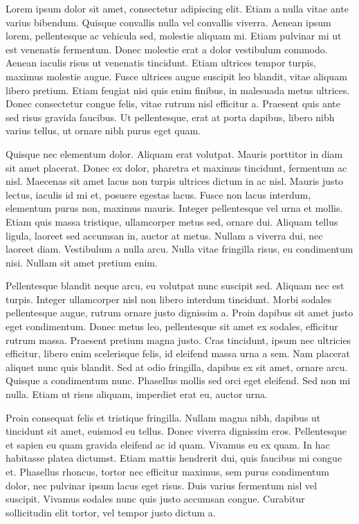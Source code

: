 \documentclass{novanarrative}
\begin{document}
Lorem ipsum dolor sit amet, consectetur adipiscing elit. Etiam a nulla vitae ante varius bibendum. Quisque convallis nulla vel convallis viverra. Aenean ipsum lorem, pellentesque ac vehicula sed, molestie aliquam mi. Etiam pulvinar mi ut est venenatis fermentum. Donec molestie erat a dolor vestibulum commodo. Aenean iaculis risus ut venenatis tincidunt. Etiam ultrices tempor turpis, maximus molestie augue. Fusce ultrices augue suscipit leo blandit, vitae aliquam libero pretium. Etiam feugiat nisi quis enim finibus, in malesuada metus ultrices. Donec consectetur congue felis, vitae rutrum nisl efficitur a. Praesent quis ante sed risus gravida faucibus. Ut pellentesque, erat at porta dapibus, libero nibh varius tellus, ut ornare nibh purus eget quam.

Quisque nec elementum dolor. Aliquam erat volutpat. Mauris porttitor in diam sit amet placerat. Donec ex dolor, pharetra et maximus tincidunt, fermentum ac nisl. Maecenas sit amet lacus non turpis ultrices dictum in ac nisl. Mauris justo lectus, iaculis id mi et, posuere egestas lacus. Fusce non lacus interdum, elementum purus non, maximus mauris. Integer pellentesque vel urna et mollis. Etiam quis massa tristique, ullamcorper metus sed, ornare dui. Aliquam tellus ligula, laoreet sed accumsan in, auctor at metus. Nullam a viverra dui, nec laoreet diam. Vestibulum a nulla arcu. Nulla vitae fringilla risus, eu condimentum nisi. Nullam sit amet pretium enim.

Pellentesque blandit neque arcu, eu volutpat nunc suscipit sed. Aliquam nec est turpis. Integer ullamcorper nisl non libero interdum tincidunt. Morbi sodales pellentesque augue, rutrum ornare justo dignissim a. Proin dapibus sit amet justo eget condimentum. Donec metus leo, pellentesque sit amet ex sodales, efficitur rutrum massa. Praesent pretium magna justo. Cras tincidunt, ipsum nec ultricies efficitur, libero enim scelerisque felis, id eleifend massa urna a sem. Nam placerat aliquet nunc quis blandit. Sed at odio fringilla, dapibus ex sit amet, ornare arcu. Quisque a condimentum nunc. Phasellus mollis sed orci eget eleifend. Sed non mi nulla. Etiam ut risus aliquam, imperdiet erat eu, auctor urna.

Proin consequat felis et tristique fringilla. Nullam magna nibh, dapibus ut tincidunt sit amet, euismod eu tellus. Donec viverra dignissim eros. Pellentesque et sapien eu quam gravida eleifend ac id quam. Vivamus eu ex quam. In hac habitasse platea dictumst. Etiam mattis hendrerit dui, quis faucibus mi congue et. Phasellus rhoncus, tortor nec efficitur maximus, sem purus condimentum dolor, nec pulvinar ipsum lacus eget risus. Duis varius fermentum nisl vel suscipit. Vivamus sodales nunc quis justo accumsan congue. Curabitur sollicitudin elit tortor, vel tempor justo dictum a.
\end{document}
